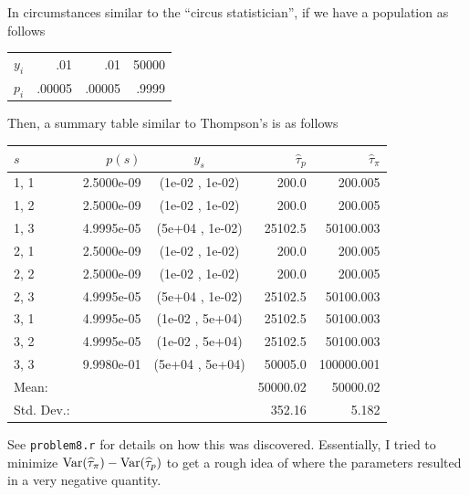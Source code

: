 \documentclass{homework}
\begin{document}
\begin{solution}
  In circumstances similar to the ``circus statistician'', if we have a population as follows


\begin{center}
\renewcommand{\arraystretch}{1.3}
\begin{tabular}{c| r r r}
\hline
$y_i$ & .01 & .01 & 50000\\
$p_i$ & .00005 & .00005 & .9999\\
\hline
\end{tabular}
\end{center}

Then, a summary table similar to Thompson's is as follows
\begin{center}
\renewcommand{\arraystretch}{1.3}
\begin{tabular}{l r c r r}
\hline
  $s$ &    $p(s)$  &      $y_s$      &$\hat\tau_p$&$\hat\tau_{\pi}$\\\hline
 1, 1 & 2.5000e-09 & (1e-02 , 1e-02) &   200.0 &    200.005\\
 1, 2 & 2.5000e-09 & (1e-02 , 1e-02) &   200.0 &    200.005\\
 1, 3 & 4.9995e-05 & (5e+04 , 1e-02) & 25102.5 &  50100.003\\
 2, 1 & 2.5000e-09 & (1e-02 , 1e-02) &   200.0 &    200.005\\
 2, 2 & 2.5000e-09 & (1e-02 , 1e-02) &   200.0 &    200.005\\
 2, 3 & 4.9995e-05 & (5e+04 , 1e-02) & 25102.5 &  50100.003\\
 3, 1 & 4.9995e-05 & (1e-02 , 5e+04) & 25102.5 &  50100.003\\
 3, 2 & 4.9995e-05 & (1e-02 , 5e+04) & 25102.5 &  50100.003\\
 3, 3 & 9.9980e-01 & (5e+04 , 5e+04) & 50005.0 & 100000.001\\
 Mean:&            &                 & 50000.02& 50000.02\\
 Std. Dev.:&       &                 & 352.16  & 5.182    \\
 
\hline
\end{tabular}
\end{center}

See \texttt{problem8.r} for details on how this was discovered.  Essentially, I tried to minimize $\mathrm{Var}(\widehat\tau_\pi) - \mathrm{Var}(\widehat\tau_p)$ to get a rough idea of where the parameters resulted in a very negative quantity.

\end{solution}
\end{document}
